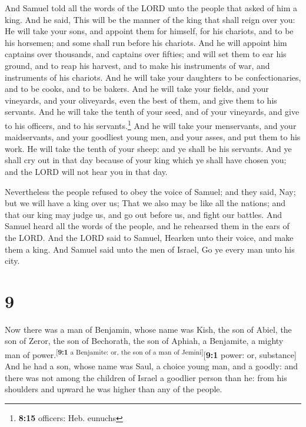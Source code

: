  And Samuel told all the words of the LORD unto the
people that asked of him a king.  And he said, This will
be the manner of the king that shall reign over you: He will take your
sons, and appoint them for himself, for his chariots, and to be his
horsemen; and some shall run before his chariots.  And he
will appoint him captains over thousands, and captains over fifties; and
will set them to ear his ground, and to reap his harvest, and to make
his instruments of war, and instruments of his chariots. 
And he will take your daughters to be confectionaries, and to be cooks,
and to be bakers.  And he will take your fields, and your
vineyards, and your oliveyards, even the best of them, and give them to
his servants.  And he will take the tenth of your seed,
and of your vineyards, and give to his officers, and to his
servants.\footnote{\textbf{8:15} officers: Heb. eunuchs} 
And he will take your menservants, and your maidservants, and your
goodliest young men, and your asses, and put them to his work.
 He will take the tenth of your sheep: and ye shall be
his servants.  And ye shall cry out in that day because
of your king which ye shall have chosen you; and the LORD will not hear
you in that day.

 Nevertheless the people refused to obey the voice of
Samuel; and they said, Nay; but we will have a king over us;
 That we also may be like all the nations; and that our
king may judge us, and go out before us, and fight our battles.
 And Samuel heard all the words of the people, and he
rehearsed them in the ears of the LORD.  And the LORD
said to Samuel, Hearken unto their voice, and make them a king. And
Samuel said unto the men of Israel, Go ye every man unto his city.

\hypertarget{section-8}{%
\section{9}\label{section-8}}

 Now there was a man of Benjamin, whose name was Kish, the
son of Abiel, the son of Zeror, the son of Bechorath, the son of Aphiah,
a Benjamite, a mighty man of power.\textsuperscript{{[}\textbf{9:1} a
Benjamite: or, the son of a man of Jemini{]}}{[}\textbf{9:1} power: or,
substance{]}  And he had a son, whose name was Saul, a
choice young man, and a goodly: and there was not among the children of
Israel a goodlier person than he: from his shoulders and upward he was
higher than any of the people.

